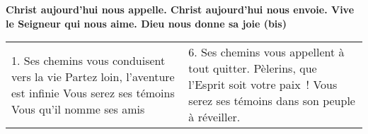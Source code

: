 \textbf{Christ aujourd'hui nous appelle.
Christ aujourd'hui nous envoie.
Vive le Seigneur qui nous aime.
Dieu nous donne sa joie (bis)}

\begin{tabular}{p{} p{}}
1. Ses chemins vous conduisent vers la vie \newline
Partez loin, l'aventure est infinie \newline
Vous serez ses témoins \newline
Vous qu'il nomme ses amis
&
%
6. Ses chemins vous appellent à tout quitter. \newline
Pèlerins, que l’Esprit soit votre paix ! \newline
Vous serez ses témoins dans son peuple à réveiller.
\end{tabular}
